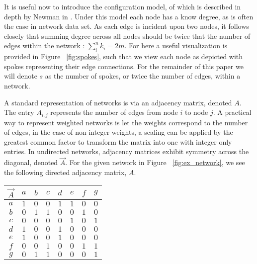 \documentclass[a4paper, 10pt, twocolumn]{article}
\begin{document}
It is useful now to introduce the configuration model, of which is described in depth by Newman in \cite{networks}. 
Under this model each node has a know degree, as is often the case in network data set.  
As each edge is incident upon two nodes, it follows closely that summing degree across all nodes should be twice that the number of edges within the network : $ \sum_{i}^{n} k_{i} = 2m $.
For here a useful visualization is provided in Figure ~\ref{fig:spokes}, such that we view each node as depicted with spokes representing their edge connections. 
For the remainder of this paper we will denote $ s $ as the number of spokes, or twice the number of edges, within a network. 

A standard representation of networks is via an adjacency matrix, denoted $ A $. 
The entry $ A_{i,j} $ represents the number of edges from node $ i $ to node $ j $. 
A practical way to represent weighted networks is let the weights correspond to the number of edges, in the case of non-integer weights, a scaling can be applied by the greatest common factor to transform the matrix into one with integer only entries. 
In undirected networks, adjacency matrices exhibit symmetry across the diagonal, denoted $ \vec{A} $. 
For the given network in Figure ~\ref{fig:ex_network}, we see the following directed adjacency matrix, $ A $.

\begin{center}
       \begin{tabular}{c|ccccccc} 
              $ \vec{A} $ & $ a $ & $ b $ & $ c $ & $ d $ & $ e $ & $ f $ & $ g $ \\
              \hline
              $ a $ & $ 1 $ & $ 0 $ & $ 0 $ & $ 1 $ & $ 1 $ & $ 0 $ & $ 0 $ \\
              $ b $ & $ 0 $ & $ 1 $ & $ 1 $ & $ 0 $ & $ 0 $ & $ 1 $ & $ 0 $ \\
              $ c $ & $ 0 $ & $ 0 $ & $ 0 $ & $ 0 $ & $ 1 $ & $ 0 $ & $ 1 $ \\
              $ d $ & $ 1 $ & $ 0 $ & $ 0 $ & $ 1 $ & $ 0 $ & $ 0 $ & $ 0 $ \\
              $ e $ & $ 1 $ & $ 0 $ & $ 0 $ & $ 1 $ & $ 0 $ & $ 0 $ & $ 0 $ \\
              $ f $ & $ 0 $ & $ 0 $ & $ 1 $ & $ 0 $ & $ 0 $ & $ 1 $ & $ 1 $ \\
              $ g $ & $ 0 $ & $ 1 $ & $ 1 $ & $ 0 $ & $ 0 $ & $ 0 $ & $ 1 $ \\
       \end{tabular}
\end{center}
\end{document}
